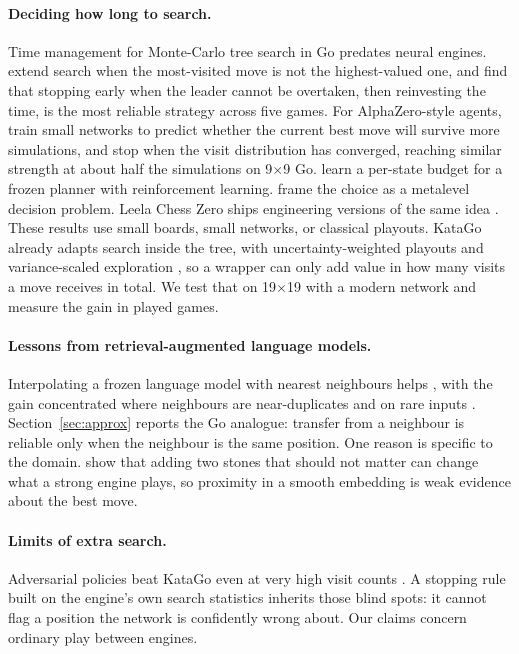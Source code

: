 \paragraph{Deciding how long to search.}
Time management for Monte-Carlo tree search in Go predates neural engines. \citet{huang2010time} extend search when the most-visited move is not the highest-valued one, and \citet{baier2016time} find that stopping early when the leader cannot be overtaken, then reinvesting the time, is the most reliable strategy across five games. For AlphaZero-style agents, \citet{lan2021learning} train small networks to predict whether the current best move will survive more simulations, and \citet{ye2022spending} stop when the visit distribution has converged, reaching similar strength at about half the simulations on 9$\times$9 Go. \citet{muppidi2026finding} learn a per-state budget for a frozen planner with reinforcement learning. \citet{hay2012selecting} frame the choice as a metalevel decision problem. Leela Chess Zero ships engineering versions of the same idea \citep{lc0_options}. These results use small boards, small networks, or classical playouts. KataGo already adapts search inside the tree, with uncertainty-weighted playouts and variance-scaled exploration \citep{katago_methods}, so a wrapper can only add value in how many visits a move receives in total. We test that on 19$\times$19 with a modern network and measure the gain in played games.

\paragraph{Lessons from retrieval-augmented language models.}
Interpolating a frozen language model with nearest neighbours helps \citep{khandelwal2020generalization}, with the gain concentrated where neighbours are near-duplicates \citep{drozdov2022you} and on rare inputs \citep{mallen2023when}. Section~\ref{sec:approx} reports the Go analogue: transfer from a neighbour is reliable only when the neighbour is the same position. One reason is specific to the domain. \citet{lan2022alphazero} show that adding two stones that should not matter can change what a strong engine plays, so proximity in a smooth embedding is weak evidence about the best move.

\paragraph{Limits of extra search.}
Adversarial policies beat KataGo even at very high visit counts \citep{wang2023adversarial,tseng2025can}. A stopping rule built on the engine's own search statistics inherits those blind spots: it cannot flag a position the network is confidently wrong about. Our claims concern ordinary play between engines.
